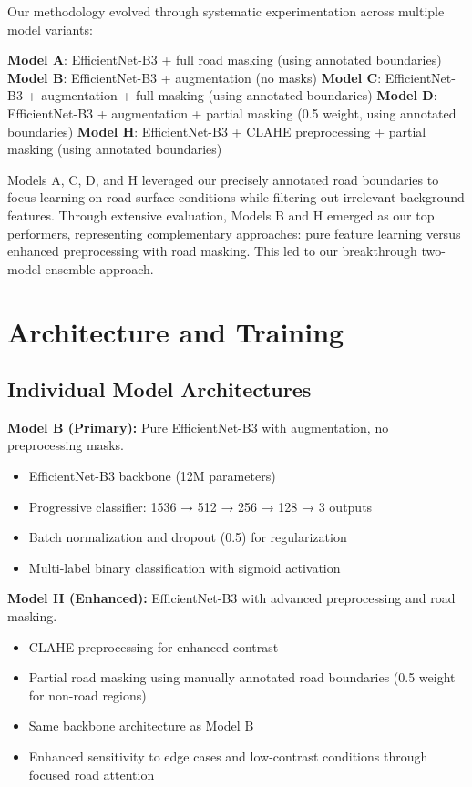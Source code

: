 \documentclass[12pt]{article}
\begin{document}
Our methodology evolved through systematic experimentation across multiple model variants:

\textbf{Model A}: EfficientNet-B3 + full road masking (using annotated boundaries)
\textbf{Model B}: EfficientNet-B3 + augmentation (no masks)  
\textbf{Model C}: EfficientNet-B3 + augmentation + full masking (using annotated boundaries)
\textbf{Model D}: EfficientNet-B3 + augmentation + partial masking (0.5 weight, using annotated boundaries)
\textbf{Model H}: EfficientNet-B3 + CLAHE preprocessing + partial masking (using annotated boundaries)

Models A, C, D, and H leveraged our precisely annotated road boundaries to focus learning on road surface conditions while filtering out irrelevant background features. Through extensive evaluation, Models B and H emerged as our top performers, representing complementary approaches: pure feature learning versus enhanced preprocessing with road masking. This led to our breakthrough two-model ensemble approach.

\section{Architecture and Training}

\subsection{Individual Model Architectures}

\textbf{Model B (Primary):} Pure EfficientNet-B3 with augmentation, no preprocessing masks.
\begin{itemize}[itemsep=1pt,parsep=0pt,topsep=2pt]
\item EfficientNet-B3 backbone (12M parameters)
\item Progressive classifier: 1536 → 512 → 256 → 128 → 3 outputs
\item Batch normalization and dropout (0.5) for regularization
\item Multi-label binary classification with sigmoid activation
\end{itemize}

\textbf{Model H (Enhanced):} EfficientNet-B3 with advanced preprocessing and road masking.
\begin{itemize}[itemsep=1pt,parsep=0pt,topsep=2pt]
\item CLAHE preprocessing for enhanced contrast
\item Partial road masking using manually annotated road boundaries (0.5 weight for non-road regions)
\item Same backbone architecture as Model B
\item Enhanced sensitivity to edge cases and low-contrast conditions through focused road attention
\end{itemize}
\end{document}
